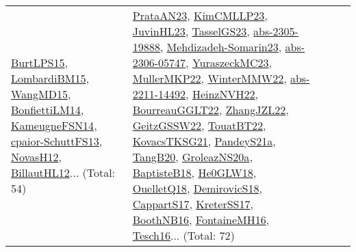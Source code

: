 {\begin{longtable}{lp{3cm}>{\raggedright}p{6cm}>{\raggedright}p{6cm}p{8cm}}
\href{papers/BurtLPS15.pdf}{BurtLPS15}\cite{BurtLPS15}, \href{papers/LombardiBM15.pdf}{LombardiBM15}\cite{LombardiBM15}, \href{articles/WangMD15.pdf}{WangMD15}\cite{WangMD15}, \href{papers/BonfiettiLM14.pdf}{BonfiettiLM14}\cite{BonfiettiLM14}, \href{articles/KameugneFSN14.pdf}{KameugneFSN14}\cite{KameugneFSN14}, \href{papers/cpaior-SchuttFS13.pdf}{cpaior-SchuttFS13}\cite{cpaior-SchuttFS13}, \href{articles/NovasH12.pdf}{NovasH12}\cite{NovasH12}, \href{papers/BillautHL12.pdf}{BillautHL12}\cite{BillautHL12}... (Total: 54) & \href{articles/PrataAN23.pdf}{PrataAN23}\cite{PrataAN23}, \href{papers/KimCMLLP23.pdf}{KimCMLLP23}\cite{KimCMLLP23}, \href{papers/JuvinHL23.pdf}{JuvinHL23}\cite{JuvinHL23}, \href{papers/TasselGS23.pdf}{TasselGS23}\cite{TasselGS23}, \href{articles/abs-2305-19888.pdf}{abs-2305-19888}\cite{abs-2305-19888}, \href{papers/Mehdizadeh-Somarin23.pdf}{Mehdizadeh-Somarin23}\cite{Mehdizadeh-Somarin23}, \href{articles/abs-2306-05747.pdf}{abs-2306-05747}\cite{abs-2306-05747}, \href{papers/YuraszeckMC23.pdf}{YuraszeckMC23}\cite{YuraszeckMC23}, \href{articles/MullerMKP22.pdf}{MullerMKP22}\cite{MullerMKP22}, \href{papers/WinterMMW22.pdf}{WinterMMW22}\cite{WinterMMW22}, \href{articles/abs-2211-14492.pdf}{abs-2211-14492}\cite{abs-2211-14492}, \href{articles/HeinzNVH22.pdf}{HeinzNVH22}\cite{HeinzNVH22}, \href{articles/BourreauGGLT22.pdf}{BourreauGGLT22}\cite{BourreauGGLT22}, \href{papers/ZhangJZL22.pdf}{ZhangJZL22}\cite{ZhangJZL22}, \href{papers/GeitzGSSW22.pdf}{GeitzGSSW22}\cite{GeitzGSSW22}, \href{papers/TouatBT22.pdf}{TouatBT22}\cite{TouatBT22}, \href{papers/KovacsTKSG21.pdf}{KovacsTKSG21}\cite{KovacsTKSG21}, \href{articles/PandeyS21a.pdf}{PandeyS21a}\cite{PandeyS21a}, \href{papers/TangB20.pdf}{TangB20}\cite{TangB20}, \href{papers/GroleazNS20a.pdf}{GroleazNS20a}\cite{GroleazNS20a}, \href{articles/BaptisteB18.pdf}{BaptisteB18}\cite{BaptisteB18}, \href{papers/He0GLW18.pdf}{He0GLW18}\cite{He0GLW18}, \href{papers/OuelletQ18.pdf}{OuelletQ18}\cite{OuelletQ18}, \href{papers/DemirovicS18.pdf}{DemirovicS18}\cite{DemirovicS18}, \href{papers/CappartS17.pdf}{CappartS17}\cite{CappartS17}, \href{articles/KreterSS17.pdf}{KreterSS17}\cite{KreterSS17}, \href{papers/BoothNB16.pdf}{BoothNB16}\cite{BoothNB16}, \href{papers/FontaineMH16.pdf}{FontaineMH16}\cite{FontaineMH16}, \href{papers/Tesch16.pdf}{Tesch16}\cite{Tesch16}... (Total: 72)\\

\end{longtable}}
